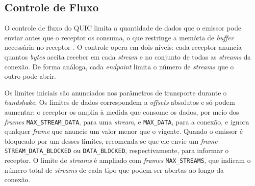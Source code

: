 \subsection{Controle de Fluxo}
\label{sec:quic_flow_control}

O controle de fluxo do QUIC limita a quantidade de dados que o emissor pode enviar antes que o receptor os consuma, o que restringe a memória de \textit{buffer} necessária no receptor \citep{rfc9000}. O controle opera em dois níveis: cada receptor anuncia quantos \textit{bytes} aceita receber em cada \textit{stream} e no conjunto de todas as \textit{streams} da conexão. De forma análoga, cada \textit{endpoint} limita o número de \textit{streams} que o outro pode abrir.

Os limites iniciais são anunciados nos parâmetros de transporte durante o \textit{handshake}. Os limites de dados correspondem a \textit{offsets} absolutos e só podem aumentar: o receptor os amplia à medida que consome os dados, por meio dos \textit{frames} \texttt{MAX\_\allowbreak{}STREAM\_\allowbreak{}DATA}, para uma \textit{stream}, e \texttt{MAX\_\allowbreak{}DATA}, para a conexão, e ignora qualquer \textit{frame} que anuncie um valor menor que o vigente. Quando o emissor é bloqueado por um desses limites, recomenda-se que ele envie um \textit{frame} \texttt{STREAM\_\allowbreak{}DATA\_\allowbreak{}BLOCKED} ou \texttt{DATA\_\allowbreak{}BLOCKED}, respectivamente, para informar o receptor. O limite de \textit{streams} é ampliado com \textit{frames} \texttt{MAX\_\allowbreak{}STREAMS}, que indicam o número total de \textit{streams} de cada tipo que podem ser abertas ao longo da conexão.

